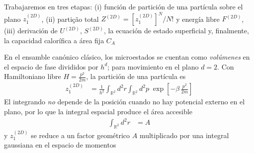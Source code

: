 \documentclass{article}
\begin{document}
\vspace{4pt}
\noindent Trabajaremos en tres etapas: (i) función de partición de una partícula sobre el plano $z_1^{(2D)}$, (ii) partição total $Z^{(2D)}= [z_1^{(2D)}]^N/N!$ y energía libre $F^{(2D)}$, (iii) derivación de $U^{(2D)}$, $S^{(2D)}$, la ecuación de estado superficial y, finalmente, la capacidad calorífica a área fija $C_A$


En el ensamble canónico clásico, los microestados se cuentan como \textit{volúmenes} en el espacio de fase divididos por $h^d$; para movimiento en el plano $d=2$. Con Hamiltoniano libre $H=\frac{p^2}{2m}$, la partición de una partícula es
\begin{equation}
\begin{split}
z_1^{(2D)}
&= \frac{1}{h^2}\int_{\mathbb{R}^2}\!d^2r\int_{\mathbb{R}^2}\!d^2p\;\exp\!\left[-\beta\,\frac{p^2}{2m}\right]
\end{split}\label{eq:z1_2D_def_can}
\end{equation}
El integrando \textit{no} depende de la posición cuando no hay potencial externo en el plano, por lo que la integral espacial produce el área accesible
\begin{equation}
\begin{split}
\int_{\mathbb{R}^2} d^2r
&= A
\end{split}\label{eq:int_area_A}
\end{equation}
y $z_1^{(2D)}$ se reduce a un factor geométrico $A$ multiplicado por una integral gaussiana en el espacio de momentos
\end{document}
